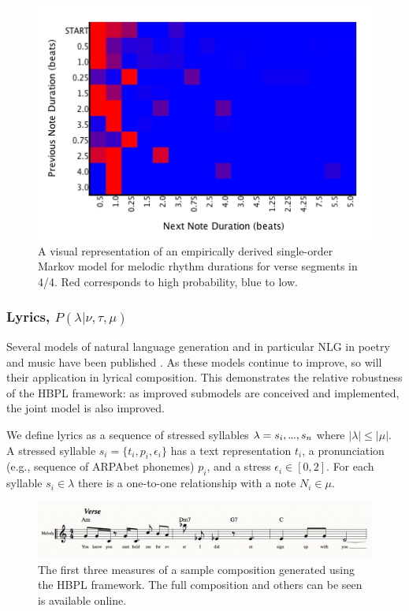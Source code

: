\documentclass[letterpaper]{article}
\newcommand\mydots{\hbox to .75em{.\hss.\hss.}}
\begin{document}
\begin{figure}[t]
	\centering
	\includegraphics[width=\linewidth]{melody_rhythm}
	\caption{\label{fig:melody_rhythm} A visual representation of an empirically derived single-order Markov model for melodic rhythm durations for verse segments in 4/4. Red corresponds to high probability, blue to low.}
\end{figure}

\subsubsection{Lyrics, $P(\lambda|\nu,\tau,\mu)$}

Several models of natural language generation and in particular NLG in poetry and music have been published \cite{??}. As these models continue to improve, so will their application in lyrical composition. This demonstrates the relative robustness of the HBPL framework: as improved submodels are conceived and implemented, the joint model is also improved.

We define lyrics as a sequence of stressed syllables $\lambda={s_i,\mydots,s_n}$ where $|\lambda| \le |\mu|$. A stressed syllable $s_i = \{t_i, p_i, \epsilon_i\}$ has a text representation $t_i$, a pronunciation (e.g., sequence of ARPAbet phonemes) $p_i$, and a stress $\epsilon_i\in[0,2]$. For each syllable $s_i\in\lambda$ there is a one-to-one relationship with a note $N_i\in\mu$.
\begin{figure}
	\centering
	\includegraphics[width=\linewidth]{example}
	\caption{\label{fig:example_composition} The first three measures of a sample composition generated using the HBPL framework. The full composition and others can be seen is available online.}
\end{figure}
\end{document}
